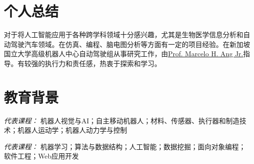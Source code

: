 \documentclass{resume}
\begin{document}




\sepspace
\faEnvelope {}
\faPhone {}
\faGlobe {}


\section{个人总结}
对于将人工智能应用于各种跨学科领域十分感兴趣，尤其是生物医学信息分析和自动驾驶汽车领域。在仿真、编程、脑电图分析等方面有一定的项目经验。在新加坡国立大学高级机器人中心自动驾驶组从事研究工作，由\href{https://guppy.mpe.nus.edu.sg/~mpeangh/}{Prof. Marcelo H. Ang Jr.}指导。有较强的执行力和责任感，热衷于探索和学习。
\sepspace

\section{教育背景}
\textit{代表课程：} 机器人视觉与AI；自主移动机器人；材料、传感器、执行器和制造技术；机器人运动学；机器人动力学与控制
\sepspace

\textit{代表课程：} 机器学习；算法与数据结构；人工智能；数据挖掘；面向对象编程；软件工程；Web应用开发
\sepspace
\end{document}
